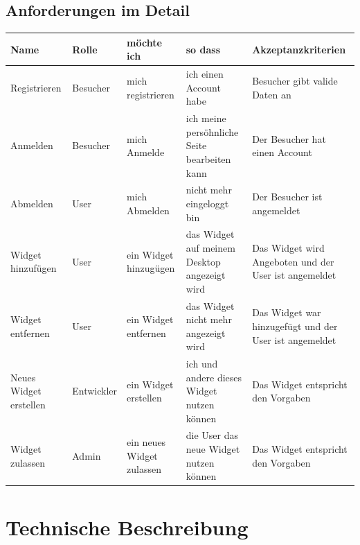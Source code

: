 	\subsection{Anforderungen im Detail}
		\label{userstor}
		\begin{center}
			\begin{tabular}{ | p{2cm} | p{2cm} | p{3cm} | p{3cm} | p{4cm} |}
				\hline
				\textbf{Name} & \textbf{Rolle} & \textbf{möchte ich} & \textbf{so dass} & \textbf{Akzeptanzkriterien}\\ \hline
				Registrieren & Besucher & mich registrieren & ich einen Account habe & Besucher gibt valide Daten an \\  \hline
				Anmelden & Besucher & mich Anmelde & ich meine persöhnliche \newline Seite bearbeiten kann & Der Besucher hat einen Account \\  \hline
				Abmelden & User & mich Abmelden & nicht mehr eingeloggt bin & Der Besucher ist angemeldet \\ \hline
				Widget hinzufügen & User & ein Widget hinzugügen & das Widget auf meinem Desktop angezeigt wird & Das Widget wird Angeboten und der User ist angemeldet \\ \hline
				Widget entfernen & User & ein Widget entfernen & das Widget nicht mehr angezeigt wird & Das Widget war hinzugefügt und der User ist angemeldet \\ \hline
				Neues Widget erstellen & Entwickler & ein Widget erstellen & ich und andere dieses Widget nutzen können & Das Widget entspricht den Vorgaben \\ \hline
				Widget zulassen & Admin & ein neues Widget zulassen & die User das neue Widget nutzen können & Das Widget entspricht den Vorgaben \\				
				\hline
			\end{tabular}
		\end{center}

\newpage
\section{Technische Beschreibung}
	\label{sysarch}
